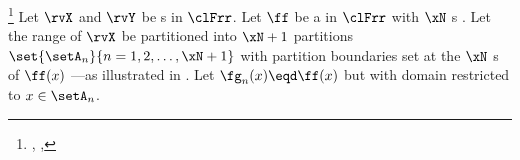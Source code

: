\begin{theorem}
\footnote{
  ,
  , 
  }
\label{thm:Y=f(X)}
\label{thm:YfX}
Let $\rvX$ and $\rvY$ be s in $\clFrr$.
Let $\ff$ be a  in $\clFrr$
with $\xN$ s .
Let the range of $\rvX$ be partitioned into $\xN+1$ partitions
$\set{\setA_n}{n=1,2,\ldots,\xN+1}$
with partition boundaries set at the $\xN$ s of $\ff(x)$%
---as illustrated in .
Let $\fg_n(x)\eqd\ff(x)$ but with domain restricted to $x\in\setA_n$.
\end{theorem}
